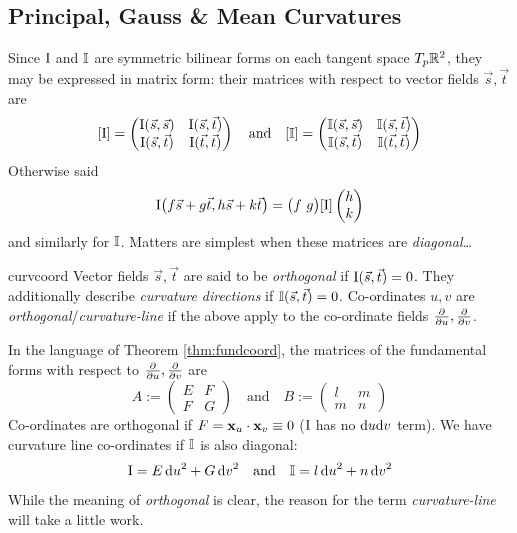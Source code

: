 \clearpage



\subsection{Principal, Gauss \& Mean Curvatures}\label{sec:principalcurv}

Since $\mathrm{I}$ and $\mathbb{I}$ are symmetric bilinear forms on each tangent space $T_p\mathbb{R}^2$, they may be expressed in matrix form: their matrices with respect to vector fields $\vec s,\vec t$ are
\[[\mathrm{I}]=\begin{pmatrix}
  	\mathrm{I}(\vec s,\vec s)&\mathrm{I}(\vec s,\vec t)\\
  	\mathrm{I}(\vec s,\vec t)&\mathrm{I}(\vec t,\vec t)
	\end{pmatrix}
	\quad\text{and}\quad
	[\mathbb{I}]=\begin{pmatrix}
  	\mathbb{I}(\vec s,\vec s)&\mathbb{I}(\vec s,\vec t)\\
  	\mathbb{I}(\vec s,\vec t)&\mathbb{I}(\vec t,\vec t)
	\end{pmatrix}\]
	Otherwise said
	\[\mathrm{I}\bigl(f\vec s+g\vec t,h\vec s+k\vec t\bigr)=\bigl(f\ g\bigr)[\mathrm{I}]\begin{pmatrix}h\\k\end{pmatrix}\]
	and similarly for $\mathbb{I}$. Matters are simplest when these matrices are \emph{diagonal\ldots}


\begin{defn}{}{curvcoord}
Vector fields $\vec s,\vec t$ are said to be \emph{orthogonal} if $\mathrm{I}(\vec s,\vec t)=0$. They  additionally describe \emph{curvature directions} if $\mathbb{I}(\vec s,\vec t)=0$.\smallbreak
Co-ordinates $u,v$ are \emph{orthogonal}/\emph{curvature-line} if the above apply to the co-ordinate fields $\frac{\partial }{\partial u},\frac{\partial }{\partial v}$.
\end{defn}

In the language of Theorem \ref{thm:fundcoord}, the matrices of the fundamental forms with respect to $\frac{\partial }{\partial u},\frac{\partial }{\partial v}$ are 
\[A:=\begin{pmatrix}
  E&F\\F&G
	\end{pmatrix}\quad\text{and}\quad
	B:=\begin{pmatrix}
  l&m\\m&n
\end{pmatrix}\]
Co-ordinates are orthogonal if $F={\mathbf{x}}_u\cdot{\mathbf{x}}_v\equiv 0$ ($\mathrm{I}$ has no ${\mathrm{d} u}{\mathrm{d} v}$ term). We have curvature line co-ordinates if $\mathbb{I}$ is also diagonal:
\[\mathrm{I}=E\,{\mathrm{d} u}^2+G\,{\mathrm{d} v}^2\quad\text{and}\quad \mathbb{I}=l\,{\mathrm{d} u}^2+n\,{\mathrm{d} v}^2\]
While the meaning of \emph{orthogonal} is clear, the reason for the term \emph{curvature-line} will take a little work.


